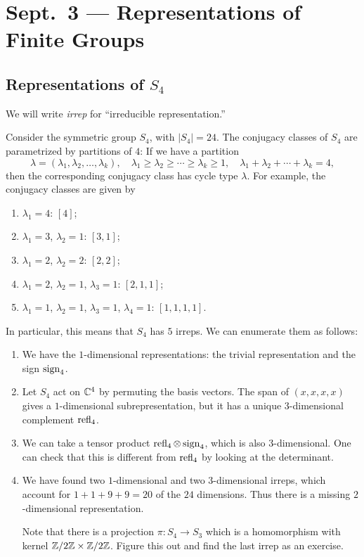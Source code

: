 \chapter{Sept.~3 --- Representations of Finite Groups}

\section{Representations of \texorpdfstring{$S_4$}{S4}}
\begin{remark}
  We will write \emph{irrep} for
  ``irreducible representation.''
\end{remark}

\begin{example}
  Consider the symmetric group
  $S_4$, with $|S_4| = 24$. The conjugacy
  classes of $S_4$ are parametrized by
  partitions of $4$: If we have a partition
  \[
    \lambda = (\lambda_1, \lambda_2, \ldots, \lambda_k), \quad
    \lambda_1 \ge \lambda_2 \ge \cdots \ge \lambda_k \ge 1,
    \quad
    \lambda_1 + \lambda_2 + \cdots + \lambda_k = 4,
  \]
  then the corresponding conjugacy class
  has cycle type $\lambda$. For
  example, the conjugacy classes are given by
  \begin{enumerate}
    \item $\lambda_1 = 4$: $[4]$;
    \item $\lambda_1 = 3$, $\lambda_2 = 1$: $[3, 1]$;
    \item $\lambda_1 = 2$, $\lambda_2 = 2$: $[2, 2]$;
    \item $\lambda_1 = 2$, $\lambda_2 = 1$, $\lambda_3 = 1$: $[2, 1, 1]$;
    \item $\lambda_1 = 1$, $\lambda_2 = 1$, $\lambda_3 = 1$, $\lambda_4 = 1$: $[1, 1, 1, 1]$.
  \end{enumerate}
  In particular, this means that
  $S_4$ has $5$ irreps. We can enumerate
  them as follows:
  \begin{enumerate}
    \item We have the $1$-dimensional representations:
      the trivial representation and the
      sign $\operatorname{sign}_4$.
    \item Let $S_4$ act on $\mathbb{C}^4$
      by permuting the basis vectors.
      The span of
      $(x, x, x, x)$ gives a $1$-dimensional
      subrepresentation, but it has
      a unique $3$-dimensional complement
      $\operatorname{refl}_4$.
    \item We can take a tensor
      product $\operatorname{refl}_4 \otimes \operatorname{sign}_4$,
      which is also $3$-dimensional. One
      can check that this is different
      from $\operatorname{refl}_4$ by looking at the
      determinant.
    \item We have found two $1$-dimensional
      and two $3$-dimensional irreps,
      which account for
      $1 + 1 + 9 + 9 = 20$ of the
      $24$ dimensions. Thus there
      is a missing $2$-dimensional
      representation.

      Note that there is a projection
      $\pi : S_4 \to S_3$ which is a
      homomorphism with kernel
      $\mathbb{Z} / 2\mathbb{Z} \times \mathbb{Z} / 2\mathbb{Z}$.
      Figure this out and find the
      last irrep as an exercise.
  \end{enumerate}
\end{example}

